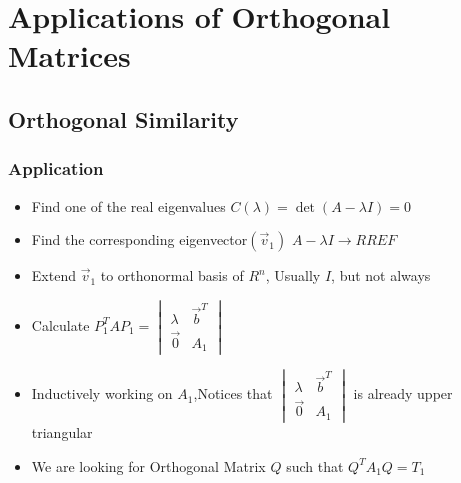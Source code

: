 \documentclass{report}
\begin{document}
\chapter{Applications of Orthogonal Matrices}
\section{Orthogonal Similarity}
\subsection{Application}
\begin{itemize}
\item Find one of the real eigenvalues $C(\lambda )=\det(A-\lambda I)=0$
\item Find the corresponding eigenvector$(\vec v_1)$ $A-\lambda I \to{RREF}$
\item Extend $\vec v_1$ to orthonormal basis of $R^n$, Usually $I$, but not always
\item Calculate $P^T_1AP_1 = \begin{vmatrix}\lambda & \vec{b}^T\\\vec{0}&A_1\end{vmatrix}$
\item Inductively working on $A_1$,Notices that $\begin{vmatrix}\lambda & \vec{b}^T\\\vec{0}&A_1\end{vmatrix}$ is already upper triangular
\item We are looking for Orthogonal Matrix $Q$ such that $Q^TA_1Q = T_1$
\end{itemize}
\end{document}
